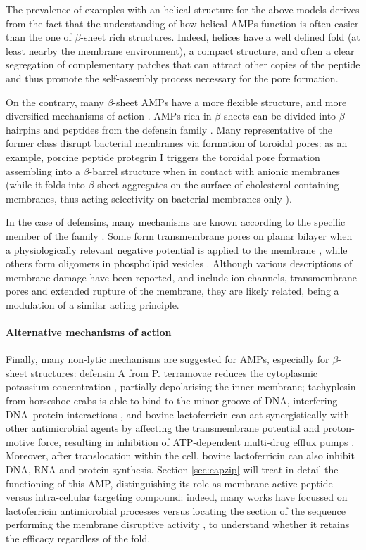 The prevalence of examples with an helical structure for the above models derives from the fact that the understanding of how helical AMPs function is often easier than the one of $\beta$-sheet rich structures.
%
Indeed, helices have a well defined fold (at least nearby the membrane environment), a compact structure, and often a clear segregation of complementary patches that can attract other copies of the peptide and thus promote the self-assembly process necessary for the pore formation.

On the contrary, many $\beta$-sheet AMPs have a more flexible structure, and more diversified mechanisms of action \cite{Nguyen2011,Mahlapuu2016}.
%
AMPs rich in $\beta$-sheets can be divided into $\beta$-hairpins and peptides from the defensin family \cite{Nguyen2011}.
%
Many representative of the former class disrupt bacterial membranes via formation of toroidal pores: as an example, porcine peptide protegrin I triggers the toroidal pore formation assembling into a $\beta$-barrel structure when in contact with anionic membranes (while it folds into $\beta$-sheet aggregates on the surface of cholesterol containing membranes, thus acting selectivity on bacterial membranes only \cite{Tang2009}).

In the case of defensins, many mechanisms are known according to the specific member of the family \cite{Lehrer2004}.
%
Some form transmembrane pores on planar bilayer when a physiologically relevant negative potential is applied to the membrane \cite{Kagan1990}, while others form oligomers in phospholipid vesicles \cite{Takeuchi2004}.
%
Although various descriptions of membrane damage have been reported, and include ion channels, transmembrane pores and extended rupture of the membrane, they are likely related, being a modulation of a similar acting principle.


\paragraph{Alternative mechanisms of action} Finally, many non-lytic mechanisms are suggested for AMPs, especially for $\beta$-sheet structures: defensin A from P. terramovae reduces the cytoplasmic potassium concentration \cite{Brogden2005}, partially depolarising the inner membrane; tachyplesin from horseshoe crabs is able to bind to the minor groove of DNA, interfering DNA–protein interactions \cite{Yonezawa1992},
%
and bovine lactoferricin can act synergistically with other antimicrobial agents by affecting the transmembrane potential and proton-motive force, resulting in inhibition of ATP-dependent multi-drug efflux pumps \cite{Gifford2005}.
%
Moreover, after translocation within the cell, bovine lactoferricin can also inhibit DNA, RNA and protein synthesis. Section \ref{sec:capzip} will treat in detail the functioning of this AMP, distinguishing its role as membrane active peptide versus intra-cellular targeting compound: indeed, many works have focussed on lactoferricin antimicrobial processes versus locating the section of the sequence performing the membrane disruptive activity \cite{Tomita1994,Schibli1999}, to understand whether it retains the efficacy regardless of the fold.


